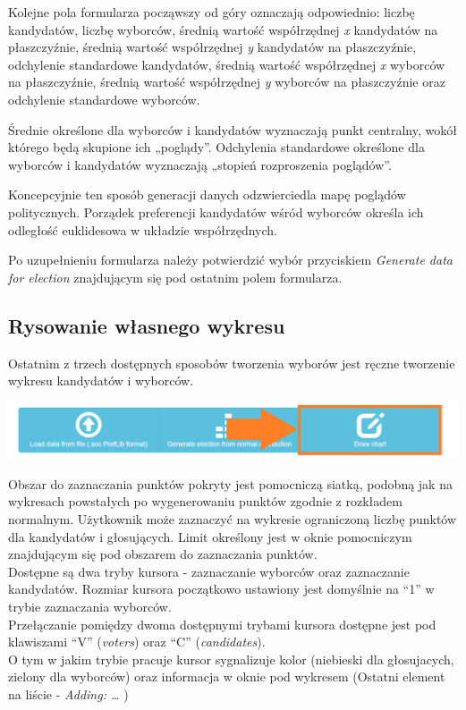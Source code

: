 \documentclass[pdflatex,11pt]{../aghdoc_version2}
\begin{document}
\vspace{\baselineskip}
Kolejne pola formularza począwszy od góry oznaczają odpowiednio: liczbę kandydatów, liczbę wyborców, średnią wartość współrzędnej \textit{x} kandydatów na płaszczyźnie, średnią wartość współrzędnej \textit{y} kandydatów na płaszczyźnie, odchylenie standardowe kandydatów, średnią wartość współrzędnej \textit{x} wyborców na płaszczyźnie, średnią wartość współrzędnej \textit{y} wyborców na płaszczyźnie oraz odchylenie standardowe wyborców.

Średnie określone dla wyborców i kandydatów wyznaczają punkt centralny, wokół którego będą skupione ich „poglądy”.  Odchylenia standardowe określone dla wyborców i kandydatów wyznaczają „stopień rozproszenia poglądów”.

Koncepcyjnie ten sposób generacji danych odzwierciedla mapę poglądów politycznych. Porządek preferencji kandydatów wśród wyborców określa ich odległość euklidesowa w układzie współrzędnych.

Po uzupełnieniu formularza należy potwierdzić wybór przyciskiem \textit{Generate data for election} znajdującym się pod ostatnim polem formularza.

\newpage
\subsection{Rysowanie własnego wykresu}
\label{subsec:wlasnywykres}
Ostatnim z trzech dostępnych sposobów tworzenia wyborów jest ręczne tworzenie wykresu kandydatów i wyborców.

\begin{center}
\includegraphics[width=1.0\textwidth]{pics/paint_election_button.png}
\end{center}
Obszar do zaznaczania punktów pokryty jest pomocniczą siatką, podobną jak na wykresach powstałych po
wygenerowaniu punktów zgodnie z rozkładem normalnym. Użytkownik może zaznaczyć na wykresie ograniczoną 
liczbę punktów dla kandydatów i głosujących. Limit określony jest w oknie pomocniczym znajdującym się 
pod obszarem do zaznaczania punktów.\\
Dostępne są dwa tryby kursora - zaznaczanie wyborców oraz zaznaczanie kandydatów. Rozmiar kursora 
początkowo ustawiony jest domyślnie na ``1'' w trybie zaznaczania wyborców.\\
Przełączanie pomiędzy dwoma dostępnymi trybami kursora dostępne jest pod klawiszami ``V'' (\textit{voters}) oraz ``C'' (\textit{candidates}).\\
O tym w jakim trybie pracuje kursor sygnalizuje kolor (niebieski dla głosujacych, zielony dla wyborców) oraz informacja w oknie pod wykresem (Ostatni element na liście - \textit{Adding: \ldots} )
\end{document}
